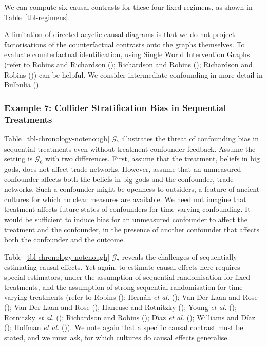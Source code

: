 \documentclass[
  single column]{article}
\begin{document}
We can compute six causal contrasts for these four fixed regimens, as
shown in Table~\ref{tbl-regimens}.

A limitation of directed acyclic causal diagrams is that we do not
project factorisations of the counterfactual contrasts onto the graphs
themselves. To evaluate counterfactual identification, using Single
World Intervention Graphs (refer to Robins and Richardson
(); Richardson and Robins
(); Richardson and Robins
()) can be helpful. We
consider intermediate confounding in more detail in Bulbulia
().

\subsubsection{Example 7: Collider Stratification Bias in Sequential
Treatments}\label{example-7-collider-stratification-bias-in-sequential-treatments}

Table~\ref{tbl-chronology-notenough} \(\mathcal{G}_7\) illustrates the
threat of confounding bias in sequential treatments even without
treatment-confounder feedback. Assume the setting is \(\mathcal{G}_6\)
with two differences. First, assume that the treatment, beliefs in big
gods, does not affect trade networks. However, assume that an unmeasured
confounder affects both the beliefs in big gods and the confounder,
trade networks. Such a confounder might be openness to outsiders, a
feature of ancient cultures for which no clear measures are available.
We need not imagine that treatment affects future states of confounders
for time-varying confounding. It would be sufficient to induce bias for
an unmeasured confounder to affect the treatment and the confounder, in
the presence of another confounder that affects both the confounder and
the outcome.

Table~\ref{tbl-chronology-notenough} \(\mathcal{G}_7\) reveals the
challenges of sequentially estimating causal effects. Yet again, to
estimate causal effects here requires special estimators, under the
assumption of sequential randomisation for fixed treatments, and the
assumption of strong sequential randomisation for time-varying
treatments (refer to Robins (); Hernán
\emph{et al.} (); Van Der Laan
and Rose (); Van Der Laan and Rose
(); Haneuse and Rotnitzky
(); Young \emph{et al.}
(); Rotnitzky \emph{et al.}
(); Richardson and Robins
(); Dı́az \emph{et al.}
(); Williams and Díaz
(); Hoffman \emph{et al.}
()). We note again that a specific
causal contrast must be stated, and we must ask, for which cultures do
causal effects generalise.
\end{document}
